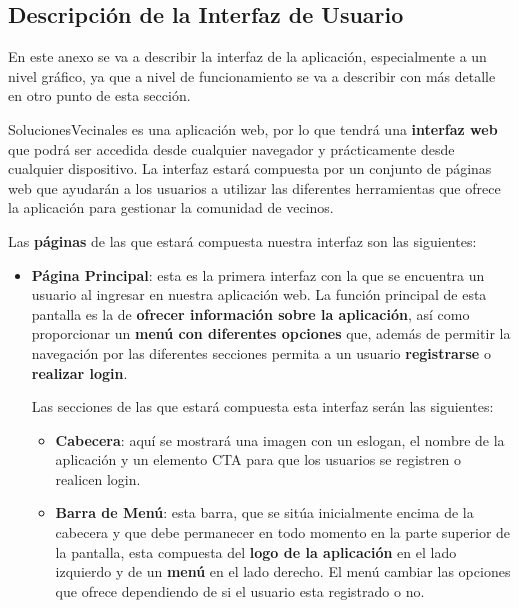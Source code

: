 \begin{appendices}
	
\section{Descripción de la Interfaz de Usuario}
\label{sec:apenA}

En este anexo se va a describir la interfaz de la aplicación, especialmente a un nivel gráfico, ya que a nivel de funcionamiento se va a describir con más detalle en otro punto de esta sección.

SolucionesVecinales es una aplicación web, por lo que tendrá una \textbf{interfaz web} que podrá ser accedida desde cualquier navegador y prácticamente desde cualquier dispositivo. La interfaz estará compuesta por un conjunto de páginas web que ayudarán a los usuarios a utilizar las diferentes herramientas que ofrece la aplicación para gestionar la comunidad de vecinos. 

Las \textbf{páginas} de las que estará compuesta nuestra interfaz son las siguientes:

\begin{itemize}
	\item \textbf{Página Principal}: esta es la primera interfaz con la que se encuentra un usuario al ingresar en nuestra aplicación web. La función principal de esta pantalla es la de \textbf{ofrecer información sobre la aplicación}, así como proporcionar un\textbf{ menú con diferentes opciones} que, además de permitir la navegación por las diferentes secciones permita a un usuario \textbf{registrarse} o \textbf{realizar \gls{login}}.
	
	Las secciones de las que estará compuesta esta interfaz serán las siguientes:
	
	\begin{itemize}
		\item \textbf{Cabecera}: aquí se mostrará una imagen con un eslogan, el nombre de la aplicación y un elemento \gls{CTA} para que los usuarios se registren o realicen login.
		
		\item \textbf{Barra de Menú}: esta barra, que se sitúa inicialmente encima de la cabecera y que debe permanecer en todo momento en la parte superior de la pantalla, esta compuesta del \textbf{logo de la aplicación} en el lado izquierdo y de un \textbf{menú} en el lado derecho. El menú cambiar las opciones que ofrece dependiendo de si el usuario esta registrado o no. 
		

\end{itemize}
\end{itemize}
\end{appendices}
